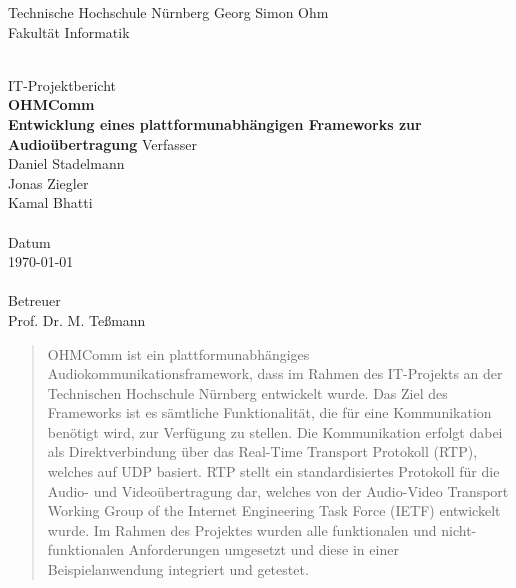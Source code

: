 \documentclass[11pt,a4paper]{report}
\begin{document}
\begin{titlepage}
  \begin{center}
    \parbox[t]{14cm}{
		\centering
      {\selectfont
			\Large
				Technische Hochschule Nürnberg Georg Simon Ohm \\
				Fakultät Informatik
			}
	}
	\\[3cm]
    \vfill    
    {\selectfont \huge IT-Projektbericht} \\[0.5cm]
    {\selectfont \LARGE \bfseries OHMComm \\ Entwicklung eines plattformunabhängigen Frameworks zur Audioübertragung}
    \vfill
    {
			\selectfont
      Verfasser \\ \large Daniel Stadelmann \\ Jonas Ziegler \\ Kamal Bhatti \\ \mbox{ } \\
      \normalsize Datum \\ \large \today \\ \mbox{ } \\
      \normalsize Betreuer \\ \large Prof. Dr. M. Teßmann \\
    } 
\end{center}
\end{titlepage}

\cleardoublepage

\begin{abstract} 
OHMComm ist ein plattformunabhängiges Audiokommunikationsframework, dass im Rahmen des IT-Projekts an der Technischen Hochschule Nürnberg entwickelt wurde. Das Ziel des Frameworks ist es sämtliche Funktionalität, die für eine Kommunikation benötigt wird, zur Verfügung zu stellen. Die Kommunikation erfolgt dabei als Direktverbindung über das Real-Time Transport Protokoll (RTP), welches auf UDP basiert. RTP stellt ein standardisiertes Protokoll für die Audio- und Videoübertragung dar, welches von der Audio-Video Transport Working Group of the Internet Engineering Task Force (IETF) entwickelt wurde. Im Rahmen des Projektes wurden alle funktionalen und nicht-funktionalen Anforderungen umgesetzt und diese in einer Beispielanwendung integriert und getestet.

\end{abstract}
\end{document}
